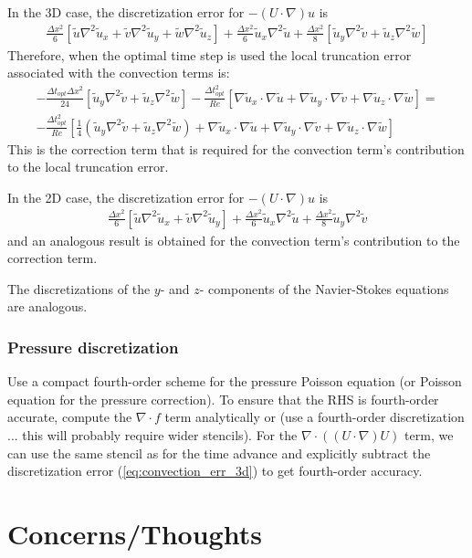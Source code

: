 \documentclass[fleqn,12pt,twoside]{article}
\newcommand{\bea}{\begin{eqnarray}}
\newcommand{\eea}{\end{eqnarray}}
\def\div{\ensuremath{\nabla \cdot}}
\def\grad{\ensuremath{\nabla}}
\def\lapl{\ensuremath{\nabla^2}}
\def\tu{\tilde{u}}
\def\tv{\tilde{v}}
\def\tw{\tilde{w}}
\def\dt{\Delta t}
\def\dx{\Delta x}
\def\dto{\dt_{opt}}
\begin{document}
In the 3D case, the discretization error for $-(U \cdot \grad) u$ is
\bea
  \frac{\dx^2}{6}
  \left[\tu \lapl \tu_x + \tv \lapl \tu_y + \tw \lapl \tu_z \right]
  + \frac{\dx^2}{6} \tu_x \lapl \tu 
  + \frac{\dx^2}{8} \left[ \tu_y \lapl \tv + \tu_z \lapl \tw \right]
  \label{eq:convection_err_3d}
\eea
Therefore, when the optimal time step is used the local truncation error
associated with the convection terms is:
\bea
  -\frac{\dto \dx^2}{24} \left[ \tu_y \lapl \tv + \tu_z \lapl \tw \right]
  -\frac{\dto^2}{Re}
    \left[ \grad \tu_x \cdot \grad \tu
         + \grad \tu_y \cdot \grad \tv
         + \grad \tu_z \cdot \grad \tw
    \right] = 
    \nonumber \\
  -\frac{\dto^2}{Re} 
  \left[ \frac{1}{4} \left( \tu_y \lapl \tv + \tu_z \lapl \tw \right)
  +  \grad \tu_x \cdot \grad \tu
  + \grad \tu_y \cdot \grad \tv
  + \grad \tu_z \cdot \grad \tw
  \right]
\eea
This is the correction term that is required for the convection term's
contribution to the local truncation error.

In the 2D case, the discretization error for $-(U \cdot \grad) u$ is
\bea
  \frac{\dx^2}{6}
  \left[\tu \lapl \tu_x + \tv \lapl \tu_y \right]
  + \frac{\dx^2}{6} \tu_x \lapl \tu 
  + \frac{\dx^2}{8} \tu_y \lapl \tv 
\eea
and an analogous result is obtained for the convection term's contribution
to the correction term.

The discretizations of the $y$- and $z$- components of the Navier-Stokes
equations are analogous.


\subsubsection{Pressure discretization}
Use a compact fourth-order scheme for the pressure Poisson equation (or 
Poisson equation for the pressure correction).  To ensure that the RHS 
is fourth-order accurate, compute the $\div f$ term analytically or (use
a fourth-order discretization ... this will probably require wider stencils).
For the $\div \left( \left(U \cdot \grad \right) U \right)$ term, we can
use the same stencil as for the time advance and explicitly subtract
the discretization error (\ref{eq:convection_err_3d}) to get fourth-order
accuracy.


\section{Concerns/Thoughts} 
\end{document}

